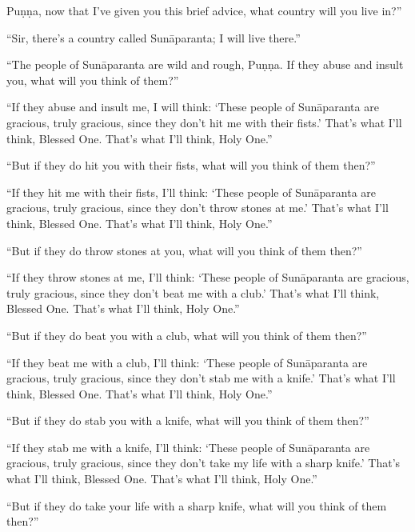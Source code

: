 \documentclass[12pt,openany]{book}%
\begin{document}
\textsanskrit{Puṇṇa}, now that I’ve given you this brief advice, what country will you live in?” 

“Sir, there’s a country called \textsanskrit{Sunāparanta}; I will live there.” 

“The people of \textsanskrit{Sunāparanta} are wild and rough, \textsanskrit{Puṇṇa}. If they abuse and insult you, what will you think of them?” 

“If they abuse and insult me, I will think: ‘These people of \textsanskrit{Sunāparanta} are gracious, truly gracious, since they don’t hit me with their fists.’ That’s what I’ll think, Blessed One. That’s what I’ll think, Holy One.” 

“But if they do hit you with their fists, what will you think of them then?” 

“If they hit me with their fists, I’ll think: ‘These people of \textsanskrit{Sunāparanta} are gracious, truly gracious, since they don’t throw stones at me.’ That’s what I’ll think, Blessed One. That’s what I’ll think, Holy One.” 

“But if they do throw stones at you, what will you think of them then?” 

“If they throw stones at me, I’ll think: ‘These people of \textsanskrit{Sunāparanta} are gracious, truly gracious, since they don’t beat me with a club.’ That’s what I’ll think, Blessed One. That’s what I’ll think, Holy One.” 

“But if they do beat you with a club, what will you think of them then?” 

“If they beat me with a club, I’ll think: ‘These people of \textsanskrit{Sunāparanta} are gracious, truly gracious, since they don’t stab me with a knife.’ That’s what I’ll think, Blessed One. That’s what I’ll think, Holy One.” 

“But if they do stab you with a knife, what will you think of them then?” 

“If they stab me with a knife, I’ll think: ‘These people of \textsanskrit{Sunāparanta} are gracious, truly gracious, since they don’t take my life with a sharp knife.’ That’s what I’ll think, Blessed One. That’s what I’ll think, Holy One.” 

“But if they do take your life with a sharp knife, what will you think of them then?” 
\end{document}
